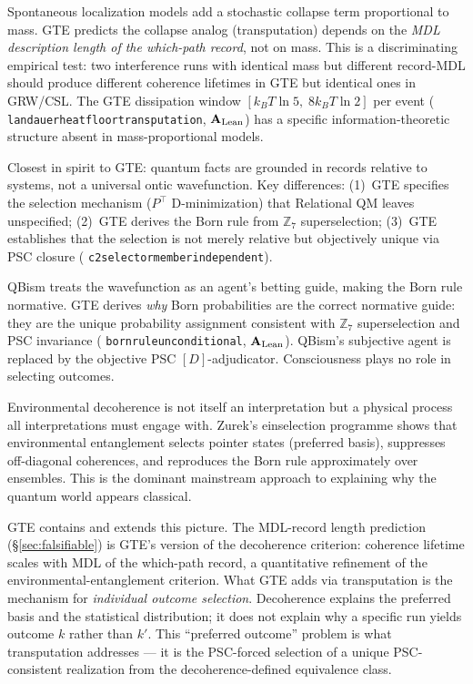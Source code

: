 \documentclass[11pt]{article}
\theoremstyle{remark}
\newcommand{\lean}[1]{%
  \penalty-100
  \begingroup\def\_{\textunderscore\allowbreak}\texttt{#1}\endgroup}
\newcommand{\CatAL}{\ensuremath{\textbf{A}_{\rm Lean}}}
\begin{document}
\begin{termlist}
\item[GRW/CSL (spontaneous collapse)~\cite{Bell1964}]
  Spontaneous localization models add a stochastic collapse term proportional to mass.
  GTE predicts the collapse analog (transputation) depends on the \emph{MDL description
  length of the which-path record}, not on mass. This is a discriminating empirical test:
  two interference runs with identical mass but different record-MDL should produce
  different coherence lifetimes in GTE but identical ones in GRW/CSL. The GTE dissipation
  window $[k_B T \ln 5,\; 8 k_B T \ln 2]$ per event (\lean{landauer\_heat\_floor\_transputation},
  \CatAL) has a specific information-theoretic structure absent in mass-proportional models.

\item[Relational QM (Rovelli)]
  Closest in spirit to GTE: quantum facts are grounded in records relative to systems,
  not a universal ontic wavefunction. Key differences: (1)~GTE specifies the selection
  mechanism ($P^\top$ D-minimization) that Relational QM leaves unspecified; (2)~GTE
  derives the Born rule from $\mathbb{Z}_7$ superselection; (3)~GTE establishes that
  the selection is not merely relative but objectively unique via PSC closure
  (\lean{c2\_selector\_member\_independent}).

\item[QBism (Fuchs et al.)]
  QBism treats the wavefunction as an agent's betting guide, making the Born rule
  normative. GTE derives \emph{why} Born probabilities are the correct normative guide:
  they are the unique probability assignment consistent with $\mathbb{Z}_7$
  superselection and PSC invariance (\lean{born\_rule\_unconditional}, \CatAL). QBism's
  subjective agent is replaced by the objective PSC $[D]$-adjudicator. Consciousness
  plays no role in selecting outcomes.

\item[Decoherence / einselection~\cite{Zurek2003}]
  Environmental decoherence is not itself an interpretation but a physical process all
  interpretations must engage with. Zurek's einselection programme shows that
  environmental entanglement selects pointer states (preferred basis), suppresses
  off-diagonal coherences, and reproduces the Born rule approximately over ensembles.
  This is the dominant mainstream approach to explaining why the quantum world appears
  classical.

  GTE contains and extends this picture. The MDL-record length prediction
  (\S\ref{sec:falsifiable}) is GTE's version of the decoherence criterion: coherence
  lifetime scales with MDL of the which-path record, a quantitative refinement of the
  environmental-entanglement criterion. What GTE adds via transputation is the mechanism
  for \emph{individual outcome selection}. Decoherence explains the preferred basis and
  the statistical distribution; it does not explain why a specific run yields outcome
  $k$ rather than $k'$. This ``preferred outcome'' problem is what transputation addresses
  --- it is the PSC-forced selection of a unique PSC-consistent realization from the
  decoherence-defined equivalence class.

\end{termlist}
\end{document}
